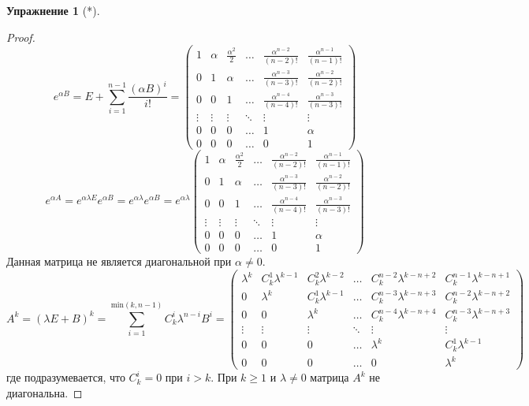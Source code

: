 \documentclass[12pt]{article}
\theoremstyle{definition}
\newtheorem{upr}[zad]{Упражнение}
\begin{document}
\begin{upr}[*]
\begin{proof}
    \begin{equation}
        e^{\alpha B}=E+\sum\limits_{i=1}^{n-1}\frac{(\alpha B)^i}{i!}=\left(
    \begin{array}{cccccc}
    1 & \alpha & \frac{\alpha^2}{2} & \ldots & \frac{\alpha^{n-2}}{(n-2)!} & \frac{\alpha^{n-1}}{(n-1)!}\\
    0 & 1 & \alpha & \ldots & \frac{\alpha^{n-3}}{(n-3)!} & \frac{\alpha^{n-2}}{(n-2)!}\\
    0 & 0 & 1 & \ldots & \frac{\alpha^{n-4}}{(n-4)!} & \frac{\alpha^{n-3}}{(n-3)!}\\
    \vdots & \vdots & \vdots &\ddots & \vdots & \vdots\\
    0 & 0 & 0 & \ldots & 1 & \alpha\\
    0 & 0 & 0 & \ldots & 0 & 1
    \end{array}
    \right)
    \end{equation}
    \begin{equation}
        e^{\alpha A}=e^{\alpha \lambda E}e^{\alpha B}=e^{\alpha\lambda}e^{\alpha B}=e^{\alpha\lambda}\left(
    \begin{array}{cccccc}
    1 & \alpha & \frac{\alpha^2}{2} & \ldots & \frac{\alpha^{n-2}}{(n-2)!} & \frac{\alpha^{n-1}}{(n-1)!}\\
    0 & 1 & \alpha & \ldots & \frac{\alpha^{n-3}}{(n-3)!} & \frac{\alpha^{n-2}}{(n-2)!}\\
    0 & 0 & 1 & \ldots & \frac{\alpha^{n-4}}{(n-4)!} & \frac{\alpha^{n-3}}{(n-3)!}\\
    \vdots & \vdots & \vdots &\ddots & \vdots & \vdots\\
    0 & 0 & 0 & \ldots & 1 & \alpha\\
    0 & 0 & 0 & \ldots & 0 & 1
    \end{array}
    \right)
    \end{equation}
    Данная матрица не является диагональной при $\alpha\neq0$.\\
    \begin{equation*}
        A^k=(\lambda E+B)^k=\sum\limits_{i=1}^{\text{min}(k,n-1)}C_k^i\lambda^{n-i}B^i=\left(
    \begin{array}{cccccc}
    \lambda^k & C_k^1\lambda^{k-1} & C_k^2\lambda^{k-2} & \ldots & C_k^{n-2}\lambda^{k-n+2} & C_k^{n-1}\lambda^{k-n+1}\\
    0 & \lambda^k & C_k^1\lambda^{k-1} & \ldots & C_k^{n-3}\lambda^{k-n+3} & C_k^{n-2}\lambda^{k-n+2}\\
    0 & 0 & \lambda^k & \ldots & C_k^{n-4}\lambda^{k-n+4} & C_k^{n-3}\lambda^{k-n+3}\\
    \vdots & \vdots & \vdots &\ddots & \vdots & \vdots\\
    0 & 0 & 0 & \ldots & \lambda^k & C_k^1\lambda^{k-1}\\
    0 & 0 & 0 & \ldots & 0 & \lambda^k
    \end{array}
    \right)
    \end{equation*}
    где подразумевается, что $C^i_k=0$ при $i>k$. При $k\geq 1$ и $\lambda\neq 0$ матрица $A^k$ не диагональна.
\end{proof}
\end{upr}
\end{document}
